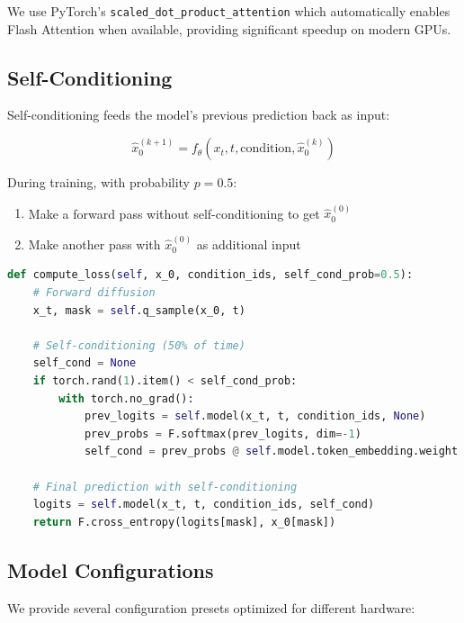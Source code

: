 \documentclass[11pt,a4paper]{article}
\begin{document}
\begin{implementation}
We use PyTorch's \texttt{scaled\_dot\_product\_attention} which automatically enables Flash Attention when available, providing significant speedup on modern GPUs.
\end{implementation}

\subsection{Self-Conditioning}

Self-conditioning feeds the model's previous prediction back as input:

\begin{equation}
    \hat{x}_0^{(k+1)} = f_\theta(x_t, t, \text{condition}, \hat{x}_0^{(k)})
\end{equation}

During training, with probability $p=0.5$:
\begin{enumerate}
    \item Make a forward pass without self-conditioning to get $\hat{x}_0^{(0)}$
    \item Make another pass with $\hat{x}_0^{(0)}$ as additional input
\end{enumerate}

\begin{lstlisting}[language=Python]
def compute_loss(self, x_0, condition_ids, self_cond_prob=0.5):
    # Forward diffusion
    x_t, mask = self.q_sample(x_0, t)
    
    # Self-conditioning (50% of time)
    self_cond = None
    if torch.rand(1).item() < self_cond_prob:
        with torch.no_grad():
            prev_logits = self.model(x_t, t, condition_ids, None)
            prev_probs = F.softmax(prev_logits, dim=-1)
            self_cond = prev_probs @ self.model.token_embedding.weight
    
    # Final prediction with self-conditioning
    logits = self.model(x_t, t, condition_ids, self_cond)
    return F.cross_entropy(logits[mask], x_0[mask])
\end{lstlisting}

\subsection{Model Configurations}

We provide several configuration presets optimized for different hardware:
\end{document}
